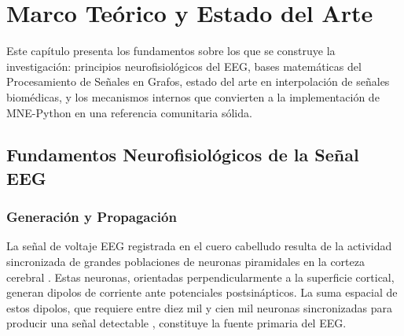 \chapter{Marco Teórico y Estado del Arte}
\label{ch:marco_teorico}

Este capítulo presenta los fundamentos sobre los que se construye la investigación: principios neurofisiológicos del EEG, bases matemáticas del Procesamiento de Señales en Grafos, estado del arte en interpolación de señales biomédicas, y los mecanismos internos que convierten a la implementación de MNE-Python en una referencia comunitaria sólida.

\section{Fundamentos Neurofisiológicos de la Señal EEG}

\subsection{Generación y Propagación}

La señal de voltaje EEG registrada en el cuero cabelludo resulta de la actividad sincronizada de grandes poblaciones de neuronas piramidales en la corteza cerebral \cite{buzsaki2006rhythms}. Estas neuronas, orientadas perpendicularmente a la superficie cortical, generan dipolos de corriente ante potenciales postsinápticos. La suma espacial de estos dipolos, que requiere entre diez mil y cien mil neuronas sincronizadas para producir una señal detectable \cite{nunez2006electric}, constituye la fuente primaria del EEG.

